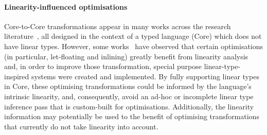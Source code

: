 \documentclass[acmsmall,review,anonymous]{acmart}
\begin{document}
% 

\paragraph{Linearity-influenced optimisations}

Core-to-Core transformations appear in many works across the research
literature~\cite{cite:let-floating,peytonjones1997a,santos1995compilation,peytonjones2002secrets,baker-finch2004constructed,maurer2017compiling,Breitner2016_1000054251,sergey_vytiniotis_jones_breitner_2017},
all designed in the context of a typed language (Core) which does not have
linear types. However, some works~\cite{cite:let-floating,peytonjones1997a,cite:linearhaskell} have observed that
certain optimisations (in particular, let-floating and inlining) greatly
benefit from linearity analysis and, in order to improve those transformation,
special purpose linear-type-inspired systems were created and implemented.
%
By fully supporting linear types in Core, these optimising transformations
could be informed by the language's intrinsic linearity, and, consequently, avoid
an ad-hoc or incomplete linear type inference pass that is custom-built for
optimisations. Additionally, the linearity information may potentially be used
to the benefit of optimising transformations that currently do not take 
linearity into account.

\end{document}
